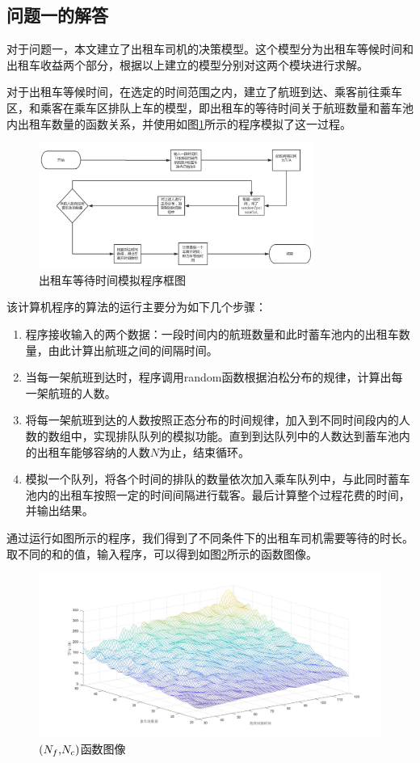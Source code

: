 \documentclass{cumcm}
\begin{document}
\subsection{问题一的解答}
对于问题一，本文建立了出租车司机的决策模型。这个模型分为出租车等候时间和出租车收益两个部分，根据以上建立的模型分别对这两个模块进行求解。\par
对于出租车等候时间，在选定的时间范围之内，建立了航班到达、乘客前往乘车区，和乘客在乘车区排队上车的模型，即出租车的等待时间\waittime 关于航班数量\flightnum 和蓄车池内出租车数量\taxinum 的函数关系，并使用如图\ref{fi:program1}所示的程序模拟了这一过程。
\begin{figure}[H]
	\centering
	\includegraphics[width=0.8\textwidth]{img/program1.jpg}
	\caption{出租车等待时间模拟程序框图}
	\label{fi:program1}
\end{figure}
\par
该计算机程序的算法的运行主要分为如下几个步骤：
\begin{enumerate}[(1)]
	\item 程序接收输入的两个数据：一段时间内的航班数量\flightnum 和此时蓄车池内的出租车数量\taxinum ，由此计算出航班之间的间隔时间。
	\item 当每一架航班到达时，程序调用random函数根据泊松分布的规律，计算出每一架航班的人数。
	\item 将每一架航班到达的人数按照正态分布的时间规律，加入到不同时间段内的人数的数组中，实现排队队列的模拟功能。直到到达队列中的人数达到蓄车池内的出租车能够容纳的人数$N$为止，结束循环。
	\item 模拟一个队列，将各个时间的排队的数量依次加入乘车队列中，与此同时蓄车池内的出租车按照一定的时间间隔进行载客。最后计算整个过程花费的时间，并输出结果。
\end{enumerate}
通过运行如图所示的程序，我们得到了不同条件下的出租车司机需要等待的时长。取不同的\flightnum 和\taxinum 的值，输入程序，可以得到如图\ref{fi:problem1func}所示的函数图像。
\begin{figure}[H]
	\centering
	\includegraphics[width=1.0\textwidth]{img/problem1_func.jpg}
	\caption{\waittime$(\mbox{$N_f$,$N_c$})$函数图像}
	\label{fi:problem1func}
\end{figure}
\end{document}
